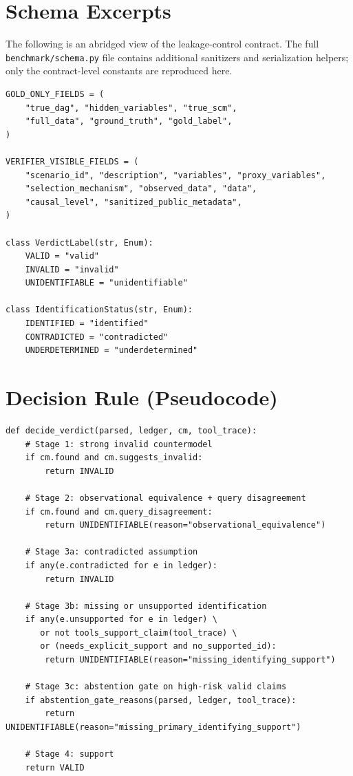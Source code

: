 \documentclass{article}
\theoremstyle{plain}
\theoremstyle{definition}
\theoremstyle{remark}
\begin{document}



\newpage
\appendix
\onecolumn
\section{Schema Excerpts}
\label{app:schema}

The following is an abridged view of the leakage-control contract. The full
\texttt{benchmark/schema.py} file contains additional sanitizers and
serialization helpers; only the contract-level constants are reproduced here.

\begin{verbatim}
GOLD_ONLY_FIELDS = (
    "true_dag", "hidden_variables", "true_scm",
    "full_data", "ground_truth", "gold_label",
)

VERIFIER_VISIBLE_FIELDS = (
    "scenario_id", "description", "variables", "proxy_variables",
    "selection_mechanism", "observed_data", "data",
    "causal_level", "sanitized_public_metadata",
)

class VerdictLabel(str, Enum):
    VALID = "valid"
    INVALID = "invalid"
    UNIDENTIFIABLE = "unidentifiable"

class IdentificationStatus(str, Enum):
    IDENTIFIED = "identified"
    CONTRADICTED = "contradicted"
    UNDERDETERMINED = "underdetermined"
\end{verbatim}

\section{Decision Rule (Pseudocode)}
\label{app:decision}

\begin{verbatim}
def decide_verdict(parsed, ledger, cm, tool_trace):
    # Stage 1: strong invalid countermodel
    if cm.found and cm.suggests_invalid:
        return INVALID

    # Stage 2: observational equivalence + query disagreement
    if cm.found and cm.query_disagreement:
        return UNIDENTIFIABLE(reason="observational_equivalence")

    # Stage 3a: contradicted assumption
    if any(e.contradicted for e in ledger):
        return INVALID

    # Stage 3b: missing or unsupported identification
    if any(e.unsupported for e in ledger) \
       or not tools_support_claim(tool_trace) \
       or (needs_explicit_support and no_supported_id):
        return UNIDENTIFIABLE(reason="missing_identifying_support")

    # Stage 3c: abstention gate on high-risk valid claims
    if abstention_gate_reasons(parsed, ledger, tool_trace):
        return UNIDENTIFIABLE(reason="missing_primary_identifying_support")

    # Stage 4: support
    return VALID
\end{verbatim}
\end{document}
